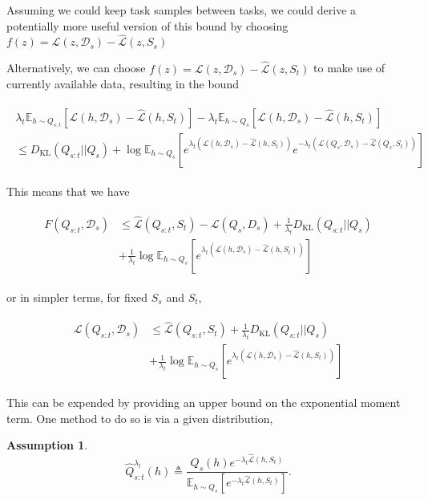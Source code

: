 \documentclass[letterpaper]{article}
\theoremstyle{definition}
\newtheorem{assumption}{Assumption}
\begin{document}
Assuming we could keep task samples between tasks, we could derive a potentially more useful version of this bound by choosing $f(z)=\mathcal{L}(z,\mathcal{D}_s)-\hat{\mathcal{L}}(z,S_s)$ %

Alternatively, we can choose $f(z)=\mathcal{L}(z,\mathcal{D}_s)-\hat{\mathcal{L}}(z,S_t)$ to make use of currently available data, resulting in the bound 


\begin{align*}
\begin{split}
\lambda_t\mathbb{E}_{h\sim Q_{s:t}}\left [\mathcal{L}(h,\mathcal{D}_s)-\hat{\mathcal{L}}(h,S_t) \right ] - \lambda_t\mathbb{E}_{h\sim Q_{s}}\left [\mathcal{L}(h,\mathcal{D}_s)-\hat{\mathcal{L}}(h,S_t) \right ] \\
\leq D_{\mathrm{KL}}(Q_{s:t}||Q_{s})+\log\mathbb{E}_{h\sim Q_{s}}\left [e^{\lambda_t(\mathcal{L}(h,\mathcal{D}_s)-\hat{\mathcal{L}}(h,S_t))}e^{-\lambda_t(\mathcal{L}(Q_s,\mathcal{D}_s)-\hat{\mathcal{L}}(Q_s,S_t))} \right ]
\end{split}
\end{align*}

This means that we have

\begin{align} \label{eq:forget-base}
\begin{split}
F(Q_{s:t},\mathcal{D}_s) &\leq \hat{\mathcal{L}}(Q_{s:t}, S_t) - \mathcal{L}(Q_{s}, D_s) + \frac{1}{\lambda_t} D_{\mathrm{KL}}(Q_{s:t}||Q_{s})\\
&+\frac{1}{\lambda_t}\log\mathbb{E}_{h\sim Q_{s}}\left [e^{\lambda_t(\mathcal{L}(h,\mathcal{D}_s)-\hat{\mathcal{L}}(h,S_t))} \right ]
\end{split}
\end{align}

or in simpler terms, for fixed $S_s$ and $S_t$,  

\begin{align} \label{eq:forget-base2}
\begin{split}
\mathcal{L}(Q_{s:t}, \mathcal{D}_s) &\leq \hat{\mathcal{L}}(Q_{s:t}, S_t) + \frac{1}{\lambda_t} D_{\mathrm{KL}}(Q_{s:t}||Q_{s})\\
&+\frac{1}{\lambda_t}\log\mathbb{E}_{h\sim Q_{s}}\left [e^{\lambda_t(\mathcal{L}(h,\mathcal{D}_s)-\hat{\mathcal{L}}(h,S_t))} \right ]
\end{split}
\end{align}

This can be expended by providing an upper bound on the exponential moment term.
One method to do so is via a given distribution, 
\begin{assumption}
\begin{equation} \label{eq-assume-gibbs}
    \hat{Q}_{s:t}^{\lambda_t}(h)\triangleq\frac{Q_s(h)e^{-\lambda_t\hat{\mathcal{L}}(h,S_t)}}{\mathbb{E}_{h\sim Q_s}\left [e^{-\lambda_t\hat{\mathcal{L}}(h,S_t)} \right ]}.
\end{equation}
\end{assumption} 
\end{document}
